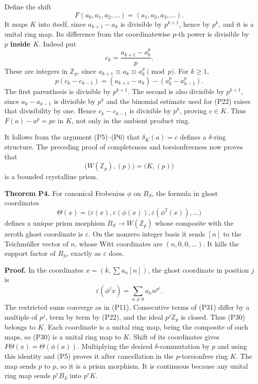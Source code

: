 \documentclass[
]{article}
\begin{document}
Define the shift \[
F(a_0,a_1,a_2,\ldots)=(a_1,a_2,a_3,\ldots).
\tag{P27}
\] It maps \(K\) into itself, since \(a_{k+1}-a_k\) is divisible by
\(p^{k+1}\), hence by \(p^k\), and it is a unital ring map. Its
difference from the coordinatewise \(p\)-th power is divisible by \(p\)
\textbf{inside \(K\)}. Indeed put \[
c_k=\frac{a_{k+1}-a_k^p}{p}.
\tag{P28}
\] These are integers in \(\mathbb Z_p\), since
\(a_{k+1}\equiv a_k\equiv a_k^p\pmod p\). For \(k\ge1\), \[
p(c_k-c_{k-1})
=(a_{k+1}-a_k)-(a_k^p-a_{k-1}^p).
\] The first parenthesis is divisible by \(p^{k+1}\). The second is also
divisible by \(p^{k+1}\), since \(a_k-a_{k-1}\) is divisible by \(p^k\)
and the binomial estimate used for (P22) raises that divisibility by
one. Hence \(c_k-c_{k-1}\) is divisible by \(p^k\), proving \(c\in K\).
Thus \(F(a)-a^p=pc\) in \(K\), not only in the ambient product ring.

It follows from the argument (P5)--(P6) that \(\delta_K(a)=c\) defines a
\(\delta\)-ring structure. The preceding proof of completeness and
torsionfreeness now proves that \[
\bigl(W(\mathbb Z_p),(p)\bigr)=\bigl(K,(p)\bigr)
\tag{P29}
\] is a bounded crystalline prism.

\textbf{Theorem P4.} For canonical Frobenius \(\phi\) on \(B_S\), the
formula in ghost coordinates \[
\Theta(x)=\bigl(\varepsilon(x),\varepsilon(\phi(x)),
\varepsilon(\phi^2(x)),\ldots\bigr)
\tag{P30}
\] defines a unique prism morphism \(B_S\to W(\mathbb Z_p)\) whose
composite with the zeroth ghost coordinate is \(\varepsilon\). On the
nonzero integer basis it sends \([n]\) to the Teichmüller vector of
\(n\), whose Witt coordinates are \((n,0,0,\ldots)\). It kills the
support factor of \(B_S\), exactly as \(\varepsilon\) does.

\textbf{Proof.} In the coordinates \(x=(k,\sum a_n[n])\), the ghost
coordinate in position \(j\) is \[
\varepsilon(\phi^j x)=\sum_{n\ne0}a_n n^{p^j}.
\tag{P31}
\] The restricted sums converge as in (P11). Consecutive terms of (P31)
differ by a multiple of \(p^j\), term by term by (P22), and the ideal
\(p^j\mathbb Z_p\) is closed. Thus (P30) belongs to \(K\). Each
coordinate is a unital ring map, being the composite of such maps, so
(P30) is a unital ring map to \(K\). Shift of its coordinates gives
\(F\Theta(x)=\Theta(\phi(x))\). Multiplying the desired
\(\delta\)-commutation by \(p\) and using this identity and (P5) proves
it after cancellation in the \(p\)-torsionfree ring \(K\). The map sends
\(p\) to \(p\), so it is a prism morphism. It is continuous because any
unital ring map sends \(p^rB_S\) into \(p^rK\).
\end{document}
